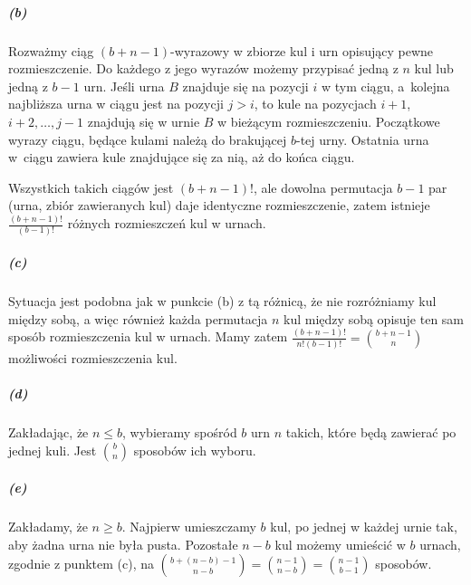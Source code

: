 \subparagraph{(b)} %
Rozważmy ciąg $(b+n-1)$-wyrazowy w zbiorze kul i urn opisujący pewne rozmieszczenie. Do każdego z jego wyrazów możemy przypisać jedną z $n$ kul lub jedną z $b-1$ urn. Jeśli urna $B$ znajduje się na pozycji $i$ w tym ciągu, a~kolejna najbliższa urna w ciągu jest na pozycji $j>i$, to kule na pozycjach $i+1$, $i+2,\dots,j-1$ znajdują się w urnie $B$ w bieżącym rozmieszczeniu. Początkowe wyrazy ciągu, będące kulami należą do brakującej $b$-tej urny. Ostatnia urna w~ciągu zawiera kule znajdujące się za nią, aż do końca ciągu.

Wszystkich takich ciągów jest $(b+n-1)!$, ale dowolna permutacja $b-1$ par (urna, zbiór zawieranych kul) daje identyczne rozmieszczenie, zatem istnieje $\frac{(b+n-1)!}{(b-1)!}$ różnych rozmieszczeń kul w urnach.

\subparagraph{(c)}
Sytuacja jest podobna jak w punkcie (b) z tą różnicą, że nie rozróżniamy kul między sobą, a więc również każda permutacja $n$ kul między sobą opisuje ten sam sposób rozmieszczenia kul w urnach. Mamy zatem $\frac{(b+n-1)!}{n!(b-1)!} = \binom{b+n-1}{n}$ możliwości rozmieszczenia kul.

\subparagraph{(d)}
Zakładając, że $n\le b$, wybieramy spośród $b$ urn $n$ takich, które będą zawierać po jednej kuli. Jest $\binom{b}{n}$ sposobów ich wyboru.

\subparagraph{(e)}
Zakładamy, że $n\ge b$. Najpierw umieszczamy $b$ kul, po jednej w każdej urnie tak, aby żadna urna nie była pusta. Pozostałe $n-b$ kul możemy umieścić w $b$ urnach, zgodnie z punktem (c), na $\binom{b+(n-b)-1}{n-b} = \binom{n-1}{n-b} = \binom{n-1}{b-1}$ sposobów.
